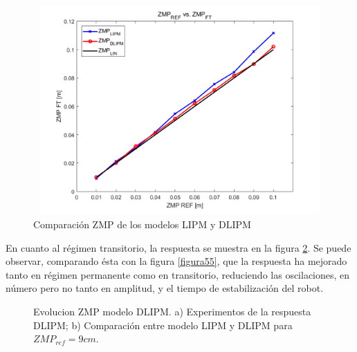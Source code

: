 \begin{figure}[H]
\centering
\includegraphics[width=13cm, height=8cm]{imagenes/apartado_5/511_compErrorModels}
\caption{Comparación ZMP de los modelos LIPM y DLIPM}
\label{figura513}
\end{figure}


En cuanto al régimen transitorio, la respuesta se muestra en la figura \ref{figura514}. Se puede observar, comparando ésta con la figura \ref{figura55}, que la respuesta ha mejorado tanto en régimen permanente como en transitorio, reduciendo las oscilaciones, en número pero no tanto en amplitud, y el tiempo de estabilización del robot.

\begin{figure}[H]
\centering
{}
\quad
{}
\caption{Evolucion ZMP modelo DLIPM. a) Experimentos de la respuesta DLIPM; b) Comparación entre modelo LIPM y DLIPM para $ZMP_{ref} = 9 cm$.}
\label{figura514}
\end{figure}

